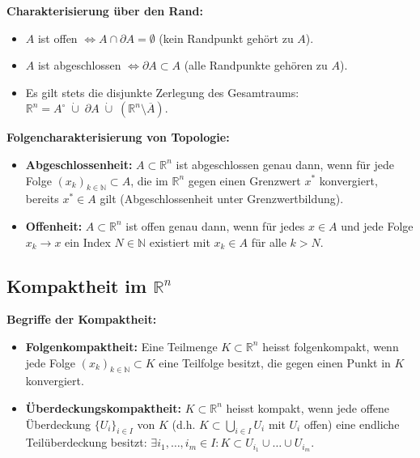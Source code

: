 \begin{lemma}
    \textbf{Charakterisierung über den Rand:}
    \begin{itemize}
        \item $A$ ist offen $\iff A \cap \partial A = \emptyset$ (kein Randpunkt gehört zu $A$).
        \item $A$ ist abgeschlossen $\iff \partial A \subset A$ (alle Randpunkte gehören zu $A$).
        \item Es gilt stets die disjunkte Zerlegung des Gesamtraums: $\mathbb{R}^n = A^\circ \;\dot{\cup}\; \partial A \;\dot{\cup}\; (\mathbb{R}^n \setminus \overline{A})$.
    \end{itemize}
\end{lemma}

\begin{theorem}
    \textbf{Folgencharakterisierung von Topologie:}
    \begin{itemize}
        \item \textbf{Abgeschlossenheit:} $A \subset \mathbb{R}^n$ ist abgeschlossen genau dann, wenn für jede Folge $(x_k)_{k \in \mathbb{N}} \subset A$, die im $\mathbb{R}^n$ gegen einen Grenzwert $x^*$ konvergiert, bereits $x^* \in A$ gilt (Abgeschlossenheit unter Grenzwertbildung).
        \item \textbf{Offenheit:} $A \subset \mathbb{R}^n$ ist offen genau dann, wenn für jedes $x \in A$ und jede Folge $x_k \to x$ ein Index $N \in \mathbb{N}$ existiert mit $x_k \in A$ für alle $k > N$.
    \end{itemize}
\end{theorem}

\subsection{Kompaktheit im $\mathbb{R}^n$}

\begin{definition}
    \textbf{Begriffe der Kompaktheit:}
    \begin{itemize}
        \item \textbf{Folgenkompaktheit:} Eine Teilmenge $K \subset \mathbb{R}^n$ heisst folgenkompakt, wenn jede Folge $(x_k)_{k \in \mathbb{N}} \subset K$ eine Teilfolge besitzt, die gegen einen Punkt in $K$ konvergiert.
        \item \textbf{Überdeckungskompaktheit:} $K \subset \mathbb{R}^n$ heisst kompakt, wenn jede offene Überdeckung $\{U_i\}_{i \in I}$ von $K$ (d.h. $K \subset \bigcup_{i \in I} U_i$ mit $U_i$ offen) eine endliche Teilüberdeckung besitzt: $\exists i_1, \dots, i_m \in I: K \subset U_{i_1} \cup \dots \cup U_{i_m}$.
    \end{itemize}
\end{definition}


